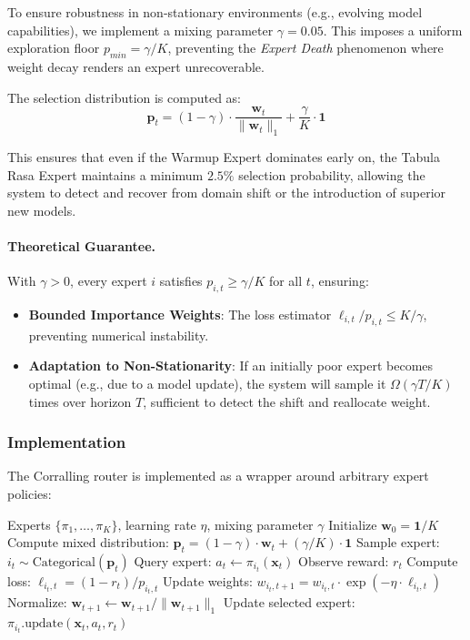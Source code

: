 To ensure robustness in non-stationary environments (e.g., evolving model capabilities), we implement a mixing parameter $\gamma=0.05$. This imposes a uniform exploration floor $p_{min} = \gamma/K$, preventing the \textit{Expert Death} phenomenon where weight decay renders an expert unrecoverable.

The selection distribution is computed as:
\begin{equation}
    \mathbf{p}_t = (1-\gamma) \cdot \frac{\mathbf{w}_t}{\|\mathbf{w}_t\|_1} + \frac{\gamma}{K} \cdot \mathbf{1}
\end{equation}

This ensures that even if the Warmup Expert dominates early on, the Tabula Rasa Expert maintains a minimum $2.5\%$ selection probability, allowing the system to detect and recover from domain shift or the introduction of superior new models.

\paragraph{Theoretical Guarantee.} With $\gamma > 0$, every expert $i$ satisfies $p_{i,t} \geq \gamma/K$ for all $t$, ensuring:
\begin{itemize}
    \item \textbf{Bounded Importance Weights}: The loss estimator $\ell_{i,t}/p_{i,t} \leq K/\gamma$, preventing numerical instability.
    \item \textbf{Adaptation to Non-Stationarity}: If an initially poor expert becomes optimal (e.g., due to a model update), the system will sample it $\Omega(\gamma T / K)$ times over horizon $T$, sufficient to detect the shift and reallocate weight.
\end{itemize}

\subsubsection{Implementation}
The Corralling router is implemented as a wrapper around arbitrary expert policies:

\begin{algorithm}[t]
\caption{Corralling with Mixing Parameter}
\label{alg:corralling}
\begin{algorithmic}[1]
\Require Experts $\{\pi_1, \ldots, \pi_K\}$, learning rate $\eta$, mixing parameter $\gamma$
\State Initialize $\mathbf{w}_0 = \mathbf{1} / K$ 
    \State Compute mixed distribution: $\mathbf{p}_t = (1-\gamma) \cdot \mathbf{w}_t + (\gamma/K) \cdot \mathbf{1}$
    \State Sample expert: $i_t \sim \text{Categorical}(\mathbf{p}_t)$
    \State Query expert: $a_t \gets \pi_{i_t}(\mathbf{x}_t)$
    \State Observe reward: $r_t$
    \State Compute loss: $\ell_{i_t, t} = (1 - r_t) / p_{i_t, t}$ 
    \State Update weights: $w_{i_t, t+1} = w_{i_t, t} \cdot \exp(-\eta \cdot \ell_{i_t, t})$
    \State Normalize: $\mathbf{w}_{t+1} \gets \mathbf{w}_{t+1} / \|\mathbf{w}_{t+1}\|_1$
    \State Update selected expert: $\pi_{i_t}.\text{update}(\mathbf{x}_t, a_t, r_t)$
\EndFor
\end{algorithmic}
\end{algorithm}

